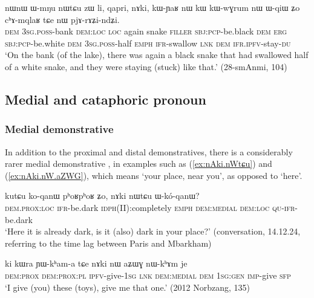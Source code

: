  \begin{exe}
\ex \label{ex:nW.pjArAZindZi}
\gll   nɯnɯ ɯ-mŋu nɯtɕu zɯ li, qapri, nɤki, kɯ-ɲaʁ nɯ kɯ kɯ-wɣrum nɯ ɯ-qiɯ ʑo cʰɤ-mqlaʁ tɕe nɯ pjɤ-rɤʑi-ndʑi. \\
\textsc{dem} \textsc{3sg}.\textsc{poss}-bank \textsc{dem}:\textsc{loc} \textsc{loc} again snake \textsc{filler} \textsc{sbj}:\textsc{pcp}-be.black \textsc{dem} \textsc{erg}  \textsc{sbj}:\textsc{pcp}-be.white \textsc{dem} \textsc{3sg}.\textsc{poss}-half \textsc{emph} \textsc{ifr}-swallow \textsc{lnk} \textsc{dem} \textsc{ifr}.\textsc{ipfv}-stay-\textsc{du} \\
\glt `On the bank (of the lake), there was again a black snake that had swallowed half of a white snake, and they were staying (stuck) like that.' (28-smAnmi, 104)
\end{exe}


\subsection{Medial and cataphoric pronoun} 

\subsubsection{Medial demonstrative} \label{sec:medial.dem.pro}
In addition to the proximal and distal demonstratives,  there is a considerably rarer medial demonstrative , in examples such as (\ref{ex:nAki.nWtɕu}) and (\ref{ex:nAki.nW.aZWG}), which means `your place, near you', as opposed to `here'.

\begin{exe}
	\ex \label{ex:nAki.nWtɕu}
	\gll kutɕu ko-qanɯ pʰoʁpʰoʁ ʑo, nɤki nɯtɕu ɯ-kó-qanɯ? \\
	\textsc{dem}.\textsc{prox}:\textsc{loc} \textsc{ifr}-be.dark \textsc{idph}(II):completely \textsc{emph} \textsc{dem}:\textsc{medial} \textsc{dem}:\textsc{loc} \textsc{qu}-\textsc{ifr}-be.dark \\
	\glt `Here it is already dark, is it (also) dark in your place?' (conversation, 14.12.24, referring to the time lag between Paris and Mbarkham)
\end{exe}

\begin{exe}
	\ex \label{ex:nAki.nW.aZWG}
	\gll  ki kɯra ɲɯ-kʰam-a tɕe nɤki nɯ aʑɯɣ nɯ-kʰɤm je \\
	\textsc{dem}:\textsc{prox} \textsc{dem}:\textsc{prox}:\textsc{pl}  \textsc{ipfv}-give-\textsc{1sg} \textsc{lnk} \textsc{dem}:\textsc{medial} \textsc{dem} \textsc{1sg}:\textsc{gen} \textsc{imp}-give \textsc{sfp} \\
	\glt `I give (you) these (toys), give me that one.'  (2012 Norbzang, 135)
\end{exe}

